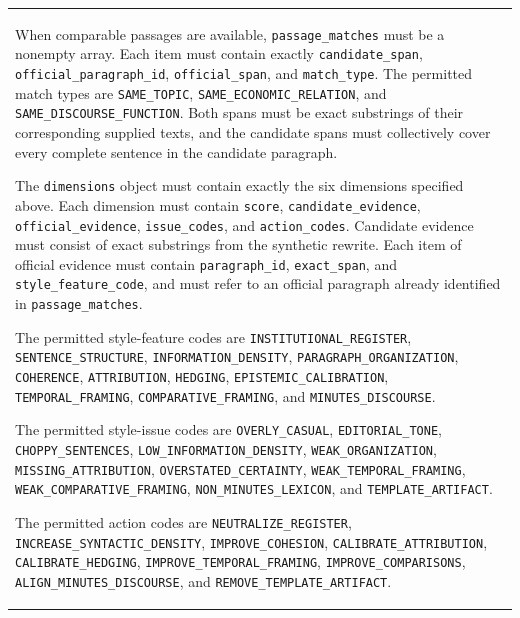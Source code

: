 \begin{longtable}{@{}p{}@{}}
    When comparable passages are available, \texttt{passage\_matches} must be
    a nonempty array. Each item must contain exactly
    \texttt{candidate\_span}, \texttt{official\_paragraph\_id},
    \texttt{official\_span}, and \texttt{match\_type}. The permitted match
    types are \texttt{SAME\_TOPIC},
    \texttt{SAME\_ECONOMIC\_RELATION}, and
    \texttt{SAME\_DISCOURSE\_FUNCTION}. Both spans must be exact substrings of
    their corresponding supplied texts, and the candidate spans must
    collectively cover every complete sentence in the candidate paragraph.
    \par\medskip

    The \texttt{dimensions} object must contain exactly the six dimensions
    specified above. Each dimension must contain
    \texttt{score}, \texttt{candidate\_evidence},
    \texttt{official\_evidence}, \texttt{issue\_codes}, and
    \texttt{action\_codes}. Candidate evidence must consist of exact
    substrings from the synthetic rewrite. Each item of official evidence must
    contain \texttt{paragraph\_id}, \texttt{exact\_span}, and
    \texttt{style\_feature\_code}, and must refer to an official paragraph
    already identified in \texttt{passage\_matches}.
    \par\medskip

    The permitted style-feature codes are
    \texttt{INSTITUTIONAL\_REGISTER},
    \texttt{SENTENCE\_STRUCTURE},
    \texttt{INFORMATION\_DENSITY},
    \texttt{PARAGRAPH\_ORGANIZATION}, \texttt{COHERENCE},
    \texttt{ATTRIBUTION}, \texttt{HEDGING},
    \texttt{EPISTEMIC\_CALIBRATION},
    \texttt{TEMPORAL\_FRAMING},
    \texttt{COMPARATIVE\_FRAMING}, and
    \texttt{MINUTES\_DISCOURSE}.
    \par\medskip

    The permitted style-issue codes are
    \texttt{OVERLY\_CASUAL}, \texttt{EDITORIAL\_TONE},
    \texttt{CHOPPY\_SENTENCES},
    \texttt{LOW\_INFORMATION\_DENSITY},
    \texttt{WEAK\_ORGANIZATION},
    \texttt{MISSING\_ATTRIBUTION},
    \texttt{OVERSTATED\_CERTAINTY},
    \texttt{WEAK\_TEMPORAL\_FRAMING},
    \texttt{WEAK\_COMPARATIVE\_FRAMING},
    \texttt{NON\_MINUTES\_LEXICON}, and
    \texttt{TEMPLATE\_ARTIFACT}.
    \par\medskip

    The permitted action codes are
    \texttt{NEUTRALIZE\_REGISTER},
    \texttt{INCREASE\_SYNTACTIC\_DENSITY},
    \texttt{IMPROVE\_COHESION},
    \texttt{CALIBRATE\_ATTRIBUTION},
    \texttt{CALIBRATE\_HEDGING},
    \texttt{IMPROVE\_TEMPORAL\_FRAMING},
    \texttt{IMPROVE\_COMPARISONS},
    \texttt{ALIGN\_MINUTES\_DISCOURSE}, and
    \texttt{REMOVE\_TEMPLATE\_ARTIFACT}.
    \par\medskip


\end{longtable}
